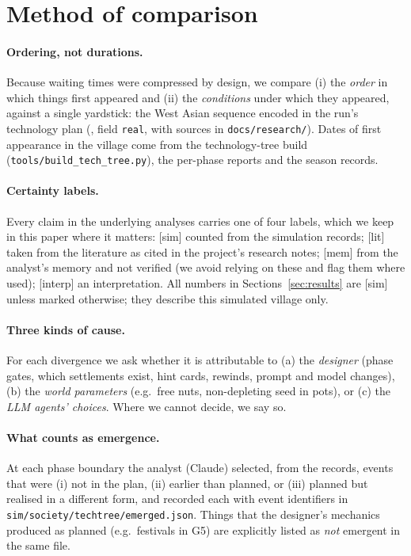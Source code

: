 \documentclass[11pt]{article}
\newcommand{\lbl}[1]{\textsf{[#1]}}
\begin{document}
\section{Method of comparison}

\paragraph{Ordering, not durations.} Because waiting times were compressed by design, we compare (i) the \emph{order} in which things first appeared and (ii) the \emph{conditions} under which they appeared, against a single yardstick: the West Asian sequence encoded in the run's technology plan (, field \texttt{real}, with sources in \texttt{docs/research/}). Dates of first appearance in the village come from the technology-tree build (\texttt{tools/build\_tech\_tree.py}), the per-phase reports and the season records.

\paragraph{Certainty labels.} Every claim in the underlying analyses carries one of four labels, which we keep in this paper where it matters: \lbl{sim} counted from the simulation records; \lbl{lit} taken from the literature as cited in the project's research notes; \lbl{mem} from the analyst's memory and not verified (we avoid relying on these and flag them where used); \lbl{interp} an interpretation. All numbers in Sections~\ref{sec:results} are \lbl{sim} unless marked otherwise; they describe this simulated village only.

\paragraph{Three kinds of cause.} For each divergence we ask whether it is attributable to (a) the \emph{designer} (phase gates, which settlements exist, hint cards, rewinds, prompt and model changes), (b) the \emph{world parameters} (e.g.\ free nuts, non-depleting seed in pots), or (c) the \emph{LLM agents' choices}. Where we cannot decide, we say so.

\paragraph{What counts as emergence.} At each phase boundary the analyst (Claude) selected, from the records, events that were (i) not in the plan, (ii) earlier than planned, or (iii) planned but realised in a different form, and recorded each with event identifiers in \texttt{sim/society/techtree/emerged.json}. Things that the designer's mechanics produced as planned (e.g.\ festivals in G5) are explicitly listed as \emph{not} emergent in the same file.
\end{document}

